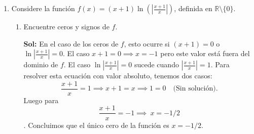 \documentclass[letterpaper,12pt]{article}
\theoremstyle{plain}
\theoremstyle{definition}
\newcommand{\R}{\mathbb{R}}
\begin{document}
\begin{enumerate}
\begin{enumerate}
\color{blue}
\textbf{Sol:} El área total como función de \( x \) queda
    \[
    A(x) = x^2 + 4x \frac{1000}{x^2} = x^2 + \frac{4000}{x}
    \]
\color{black}
    
    \item  Pruebe que \( x = 10 \sqrt[3]{2} \) es un mínimo de \( A \).

\color{blue}
\textbf{Sol:} Dada la naturaleza del problema el dominio de \( A \) es \( (0, \infty) \). Calculamos la derivada de \( A \) respecto a \( x \) obteniendo
    \[
    A'(x) = 2x - \frac{4000}{x^2}
    \]
    e igualando a 0 obtenemos el punto crítico \( x = 10 \sqrt[3]{2} \). Ahora podemos analizar el crecimiento de \( A \) vía el signo de \( A' \)
    \[
    \begin{array}{c|cc}
    & (0, 10 \sqrt[3]{2}) & (10 \sqrt[3]{2}, \infty) \\ \hline
    A'(x) & - & + \\
    A & \searrow & \nearrow \\
    \end{array}
    \]
    con lo que \( x = 10 \sqrt[3]{2} \) es mínimo global de \( A \).

    Alternativamente podemos usar el criterio de la segunda derivada:
    \[
    A''(x) = 2 + \frac{8000}{x^3} \implies A''(10 \sqrt[3]{2}) > 0,
    \]
\color{black}
\item Concluya

\color{blue}
\textbf{Sol:}
Las dimensiones de la caja para que la superficie sea mínima son \( x = 10 \sqrt[3]{2} \) e \( y = \frac{10}{\sqrt[3]{2}} = 5 \sqrt[3]{2} \) y la superficie mínima es
\[
A(10 \sqrt[3]{2}) = 100 \sqrt[3]{4} + 4 \cdot 10 \sqrt[3]{2} \cdot 5 \sqrt[3]{2} = 300 \sqrt[3]{4}
\]
\color{black}

\end{enumerate}

\item Considere la función $f(x) = (x + 1) \ln \left( \left| \frac{x + 1}{x} \right| \right)$, definida en $\R \setminus \{0\}$.
\begin{enumerate}
    \item Encuentre ceros y signos de $f$.
    
\color{blue}
\textbf{Sol:} En el caso de los ceros de $f$, esto ocurre si $(x + 1) = 0$ o $\ln \left| \frac{x + 1}{x} \right| = 0$.
 El caso $x + 1 = 0 \implies x = -1$ pero este valor está fuera del dominio de $f$. El caso $\ln \left| \frac{x + 1}{x} \right| = 0$ sucede cuando $\left| \frac{x + 1}{x} \right| = 1$. Para resolver esta ecuación con valor absoluto, tenemos dos casos:
  $$\frac{x + 1}{x} = 1 \implies x + 1 = x \implies 1 = 0 \quad \text{(Sin solución).}$$ 
  Luego para
$$\frac{x + 1}{x} = -1 \implies\ x = -1/2$$. 
Concluimos que el único cero de la función es $x = -1/2$.


\end{enumerate}
\end{enumerate}
\end{document}
